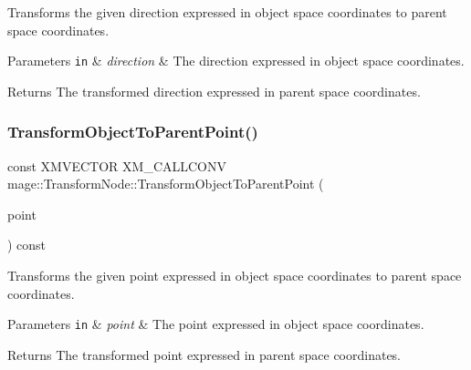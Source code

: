 Transforms the given direction expressed in object space coordinates to parent space coordinates.


\begin{DoxyParams}[1]{Parameters}
\mbox{\tt in}  & {\em direction} & The direction expressed in object space coordinates. \\
\hline
\end{DoxyParams}
\begin{DoxyReturn}{Returns}
The transformed direction expressed in parent space coordinates. 
\end{DoxyReturn}
\hypertarget{structmage_1_1_transform_node_a449428a24f76ca18b91f84ba3e69c0f3}{}\label{structmage_1_1_transform_node_a449428a24f76ca18b91f84ba3e69c0f3} 
\subsubsection{\texorpdfstring{Transform\+Object\+To\+Parent\+Point()}{TransformObjectToParentPoint()}}
{\footnotesize\ttfamily const X\+M\+V\+E\+C\+T\+OR X\+M\+\_\+\+C\+A\+L\+L\+C\+O\+NV mage\+::\+Transform\+Node\+::\+Transform\+Object\+To\+Parent\+Point (\begin{DoxyParamCaption}\item[{F\+X\+M\+V\+E\+C\+T\+OR}]{point }\end{DoxyParamCaption}) const\hspace{0.3cm}{\ttfamily [noexcept]}}

Transforms the given point expressed in object space coordinates to parent space coordinates.


\begin{DoxyParams}[1]{Parameters}
\mbox{\tt in}  & {\em point} & The point expressed in object space coordinates. \\
\hline
\end{DoxyParams}
\begin{DoxyReturn}{Returns}
The transformed point expressed in parent space coordinates. 
\end{DoxyReturn}
\hypertarget{structmage_1_1_transform_node_a93cad83498de7702b0c888260862ec39}{}\label{structmage_1_1_transform_node_a93cad83498de7702b0c888260862ec39} 
